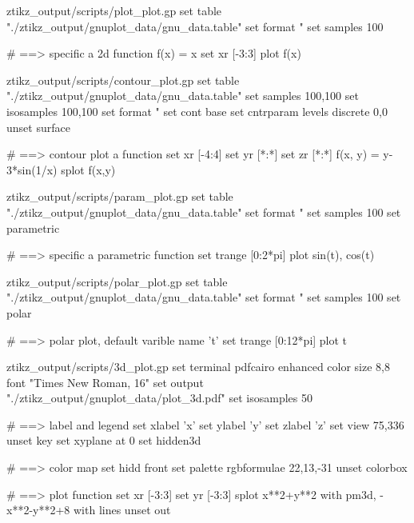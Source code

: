 \ExplSyntaxOff
\begingroup\newif\ifgnuscript
{}

\ifgnuscript
{}
\begin{filecontents}[noheader]{ztikz_output/scripts/plot_plot.gp}
set table "./ztikz_output/gnuplot_data/gnu_data.table"
set format "%
set samples 100


# ==> specific a 2d function
f(x) = x
set xr [-3:3]
plot f(x)
\end{filecontents}

\begin{filecontents}[noheader]{ztikz_output/scripts/contour_plot.gp}
set table "./ztikz_output/gnuplot_data/gnu_data.table"
set samples 100,100
set isosamples 100,100
set format "%
set cont base
set cntrparam levels discrete 0,0
unset surface


# ==> contour plot a function
set xr [-4:4]
set yr [*:*]
set zr [*:*]
f(x, y) = y-3*sin(1/x)
splot f(x,y)
\end{filecontents}

\begin{filecontents}[noheader]{ztikz_output/scripts/param_plot.gp}
set table "./ztikz_output/gnuplot_data/gnu_data.table"
set format "%
set samples 100
set parametric


# ==> specific a parametric function
set trange [0:2*pi]
plot sin(t), cos(t)  
\end{filecontents}

\begin{filecontents}[noheader]{ztikz_output/scripts/polar_plot.gp}
set table "./ztikz_output/gnuplot_data/gnu_data.table"
set format "%
set samples 100
set polar


# ==> polar plot, default varible name 't'
set trange [0:12*pi]
plot t
\end{filecontents}

\begin{filecontents}[noheader]{ztikz_output/scripts/3d_plot.gp}
set terminal pdfcairo enhanced color size 8,8 font "Times New Roman, 16"
set output "./ztikz_output/gnuplot_data/plot_3d.pdf"
set isosamples 50


# ==> label and legend
set xlabel 'x'
set ylabel 'y'
set zlabel 'z'
set view 75,336
unset key
set xyplane at 0
set hidden3d


# ==> color map
set hidd front
set palette rgbformulae 22,13,-31
unset colorbox


# ==> plot function
set xr [-3:3]
set yr [-3:3]
splot x**2+y**2 with pm3d, -x**2-y**2+8 with lines
unset out 
\end{filecontents}
\fi\endgroup\ExplSyntaxOn